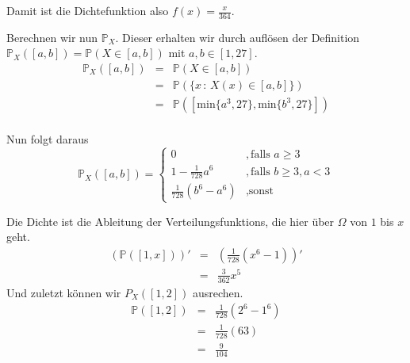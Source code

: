 \documentclass[11pt,a4paper,ngerman]{article}
\begin{document}
Damit ist die Dichtefunktion also $f(x) = \frac{x}{364}$.

Berechnen wir nun $\mathbb{P}_X$. Dieser erhalten wir durch auflösen der Definition $\mathbb{P}_X([a,b]) = \mathbb{P}(X \in [a,b])$ mit $a,b \in [1,27]$.
$$\begin{array}{rlc}
    \mathbb{P}_X([a,b]) &=& \mathbb{P}(X \in [a,b])\\
                        &=& \mathbb{P}(\{x \, : \, X(x) \in [a,b]\})\\
                        &=& \mathbb{P}([\text{min}\{a^3,27\},\text{min}\{b^3,27\}])\\
\end{array}$$

    Nun folgt daraus
\[
    \mathbb{P}_X([a,b]) = \left\{ 
    \begin{array}{lr}
        0 &,\text{falls }a\geq3\\
        1 - \frac{1}{728} a^6 &,\text{falls }b\geq 3, a<3\\
        \frac{1}{728}\left( b^6 - a^6\right)&, \text{sonst}
    \end{array}
    \right.
\]

    Die Dichte ist die Ableitung der Verteilungsfunktions, die hier über $\Omega$ von $1$ bis $x$ geht.
\[
   \begin{array}{rcl}
        (\mathbb{P}([1,x]))'    &=& \left( \frac{1}{728} \left( x^6 - 1\right) \right)'\\
                                &=& \frac{3}{362} x^5
    \end{array}
\]
    Und zuletzt können wir $P_X([1,2])$ ausrechen.
\[
    \begin{array}{rcl}
        \mathbb{P}([1,2])   &=& \frac{1}{728} (2^6 - 1^6)\\
                            &=& \frac{1}{728} (63)\\
                            &=& \frac{9}{104}
    \end{array}
\]
\label{LastPage}
\end{document}
